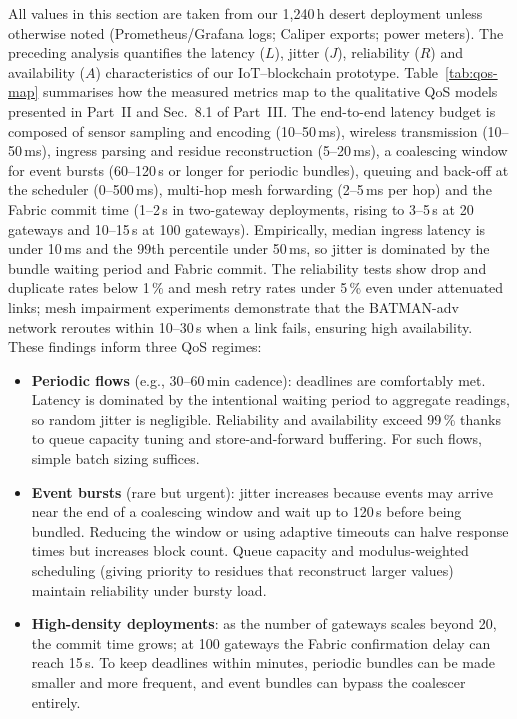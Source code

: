 \documentclass[12pt,onecolumn]{IEEEtran} %
\begin{document}
All values in this section are taken from our 1{,}240\,h desert deployment unless otherwise noted (Prometheus/Grafana logs; Caliper exports; power meters). The preceding analysis quantifies the latency ($L$), jitter ($J$), reliability ($R$) and availability ($A$) characteristics of our IoT–blockchain prototype. Table~\ref{tab:qos-map} summarises how the measured metrics map to the qualitative QoS models presented in Part~II and Sec.~8.1 of Part~III. The end-to-end latency budget is composed of sensor sampling and encoding (10–50\,ms), wireless transmission (10–50\,ms), ingress parsing and residue reconstruction (5–20\,ms), a coalescing window for event bursts (60–120\,s or longer for periodic bundles), queuing and back-off at the scheduler (0–500\,ms), multi-hop mesh forwarding (2–5\,ms per hop) and the Fabric commit time (1–2\,s in two-gateway deployments, rising to 3–5\,s at 20 gateways and 10–15\,s at 100 gateways). Empirically, median ingress latency is under 10\,ms and the 99th percentile under 50\,ms, so jitter is dominated by the bundle waiting period and Fabric commit. The reliability tests show drop and duplicate rates below 1\,\% and mesh retry rates under 5\,\% even under attenuated links; mesh impairment experiments demonstrate that the BATMAN-adv network reroutes within 10–30\,s when a link fails, ensuring high availability. These findings inform three QoS regimes:
\begin{itemize}
  \item \textbf{Periodic flows} (e.g., 30–60\,min cadence): deadlines are comfortably met. Latency is dominated by the intentional waiting period to aggregate readings, so random jitter is negligible. Reliability and availability exceed 99\,\% thanks to queue capacity tuning and store-and-forward buffering. For such flows, simple batch sizing suffices.
  \item \textbf{Event bursts} (rare but urgent): jitter increases because events may arrive near the end of a coalescing window and wait up to 120\,s before being bundled. Reducing the window or using adaptive timeouts can halve response times but increases block count. Queue capacity and modulus-weighted scheduling (giving priority to residues that reconstruct larger values) maintain reliability under bursty load.
  \item \textbf{High-density deployments}: as the number of gateways scales beyond 20, the commit time grows; at 100 gateways the Fabric confirmation delay can reach 15\,s. To keep deadlines within minutes, periodic bundles can be made smaller and more frequent, and event bundles can bypass the coalescer entirely.
\end{itemize}
\end{document}
